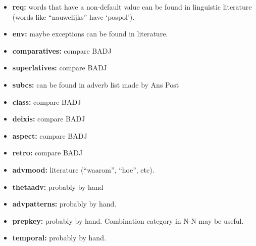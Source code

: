 \begin{itemize}
\item {\bf req:} words that have a non-default value can be found in 
        linguistic literature (words like ``nauwelijks'' have `pospol').

\item {\bf env:} maybe exceptions can be found in literature.

\item {\bf  comparatives:} compare BADJ

\item {\bf  superlatives:} compare BADJ

\item {\bf  subcs:} can be found in adverb list made by Ans Post

\item {\bf  class:} compare BADJ

\item {\bf  deixis:} compare BADJ

\item {\bf  aspect:} compare BADJ

\item {\bf  retro:} compare BADJ

\item {\bf  advmood:} literature (``waarom'', ``hoe'', etc).

\item {\bf  thetaadv:} probably by hand

\item {\bf  advpatterns:} probably by hand.

\item {\bf  prepkey:} probably by hand. Combination category in N-N may be 
      useful.
\item {\bf  temporal:} probably by hand.

\end{itemize}


